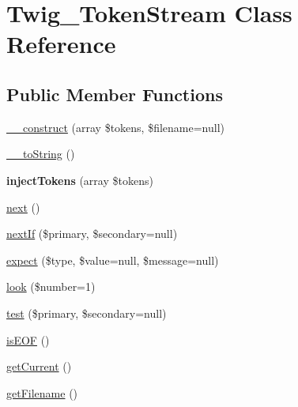 \hypertarget{classTwig__TokenStream}{}\section{Twig\+\_\+\+Token\+Stream Class Reference}
\label{classTwig__TokenStream}
\subsection*{Public Member Functions}
\begin{DoxyCompactItemize}
\item 
\hyperlink{classTwig__TokenStream_a5d3f6f0c9703ad488e0fd6677ad64052}{\+\_\+\+\_\+construct} (array \$tokens, \$filename=null)
\item 
\hyperlink{classTwig__TokenStream_a99d5d23c3b14ead14b96b4944a28a0f1}{\+\_\+\+\_\+to\+String} ()
\item 
{\bfseries inject\+Tokens} (array \$tokens)\hypertarget{classTwig__TokenStream_a92782cbe3a6d3b4a77dd1acab653b1b5}{}\label{classTwig__TokenStream_a92782cbe3a6d3b4a77dd1acab653b1b5}

\item 
\hyperlink{classTwig__TokenStream_ad33f66b241070b5f43523bc1d8a04511}{next} ()
\item 
\hyperlink{classTwig__TokenStream_a02822b90457dcb5fcb11ce7685da92ce}{next\+If} (\$primary, \$secondary=null)
\item 
\hyperlink{classTwig__TokenStream_a03fd6343727a8e1ca89ac071485f118c}{expect} (\$type, \$value=null, \$message=null)
\item 
\hyperlink{classTwig__TokenStream_a0f770769036131f910756b0cf174fed7}{look} (\$number=1)
\item 
\hyperlink{classTwig__TokenStream_aba7e51cc1fc2feffc1e62ba4cbf66a7b}{test} (\$primary, \$secondary=null)
\item 
\hyperlink{classTwig__TokenStream_a15c535a83e27a74bf1ee441e494f13dd}{is\+E\+OF} ()
\item 
\hyperlink{classTwig__TokenStream_ab3fc859937886ef0f828349c4309b1a6}{get\+Current} ()
\item 
\hyperlink{classTwig__TokenStream_a47310c25e033be5068ac5def6fb9c188}{get\+Filename} ()
\end{DoxyCompactItemize}
